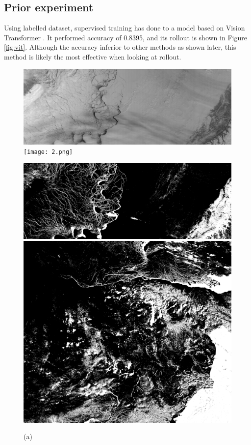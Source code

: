 \documentclass{article}
\begin{document}
    \subsection{Prior experiment} \label{sec:vit}
        Using labelled dataset,
        supervised training has done to a model based on Vision Transformer \cite{vit}.
        It performed accuracy of 0.8395, and its rollout is shown in Figure \ref{fig:vit}.
        Although the accuracy inferior to other methods as shown later,
        this method is likely the most effective when looking at rollout.

        \begin{figure}[ht]
            \centering
            \begin{minipage}{0.49\hsize}
                \centering
                \includegraphics[width = 1\hsize]{1.png}
                \texttt{[image: 2.png]}
                \caption*{(a)}
            \end{minipage}
            \begin{minipage}{0.49\hsize}
                \centering
                \includegraphics[width = 1\hsize]{1_vit.png}
                \includegraphics[width = 1\hsize]{2_vit.png}

\end{minipage}
\end{figure}
\end{document}
